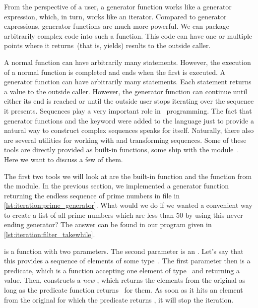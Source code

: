 From the perspective of a user, a generator function works like a generator expression, which, in turn, works like an iterator.
Compared to generator expressions, generator functions are much more powerful.
We can package arbitrarily complex code into such a function.
This code can have one or multiple points where it returns~(that is, yields) results to the outside caller.

A normal function can have arbitrarily many  statements.
However, the execution of a normal function is completed and ends when the first  is executed.
A generator function can have arbitrarily many  statements.
Each statement returns a value to the outside caller.
However, the generator function can continue until either its end is reached or until the outside user stops iterating over the sequence it presents.%
\FloatBarrier%
\endhsection%
%
%
\label{sec:operationsOnIterators}%
%
%
%
%
Sequences play a very important role in \python\ programming.
The fact that generator functions and the  keyword were added to the language just to provide a natural way to construct complex sequences speaks for itself.
Naturally, there also are several utilities for working with and transforming sequences.
Some of these tools are directly provided as built-in functions, some ship with the module~.
Here we want to discuss a few of them.

The first two tools we will look at are the built-in function  and the  function from the  module.
In the previous section, we implemented a generator function returning the endless sequence of prime numbers in file  in \cref{lst:iteration:prime_generator}.
What would we do if we wanted a convenient way to create a list of all prime numbers which are less than 50 by using this never-ending generator?
The answer can be found in our program  given in \cref{lst:iteration:filter_takewhile}.

 is a function with two parameters.
The second parameter is an .
Let's say that this  provides a sequence of elements of some type~.
The first parameter then is a predicate, which is a function accepting one element of type~ and returning a  value.
Then,  constructs a \emph{new} , which returns the elements from the original  as long as the predicate function returns~ for them.
As soon as it hits an element from the original  for which the predicate returns , it will stop the iteration.

